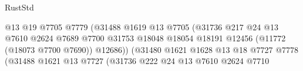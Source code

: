\begin{lexlean}{RustStd}
\begin{coremodule}
                                                      @13
                                                      @19
                                                      @7705
                                                      @7779
                                                      (@31488
                                                        @1619
                                                        @13
                                                        @7705
                                                        (@31736
                                                          @217
                                                          @24
                                                          @13
                                                          @7610
                                                          @2624
                                                          @7689
                                                          @7700
                                                          @31753
                                                          @18048
                                                          @18054
                                                          @18191
                                                          @12456
                                                          (@11772 (@18073 @7700 @7690))
                                                          @12686))
                                                      (@31480
                                                        @1621
                                                        @1628
                                                        @13
                                                        @18
                                                        @7727
                                                        @7778
                                                        (@31488
                                                          @1621
                                                          @13
                                                          @7727
                                                          (@31736
                                                            @222
                                                            @24
                                                            @13
                                                            @7610
                                                            @2624
                                                            @7710

\end{coremodule}
\end{lexlean}
